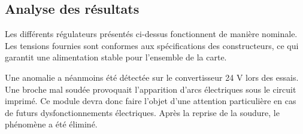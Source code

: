\begin{table}[H]
    \centering
    \caption{Mesures sur les régulateurs 0.5V (U5)}
    \label{tab:reg_0_5v}
\end{table}

\subsection{Analyse des résultats}
Les différents régulateurs présentés ci-dessus fonctionnent de manière nominale. Les tensions fournies sont conformes aux spécifications des constructeurs, ce qui garantit une alimentation stable pour l'ensemble de la carte.

Une anomalie a néanmoins été détectée sur le convertisseur 24 V lors des essais. Une broche mal soudée provoquait l'apparition d'arcs électriques sous le circuit imprimé. Ce module devra donc faire l'objet d'une attention particulière en cas de futurs dysfonctionnements électriques. Après la reprise de la soudure, le phénomène a été éliminé.

